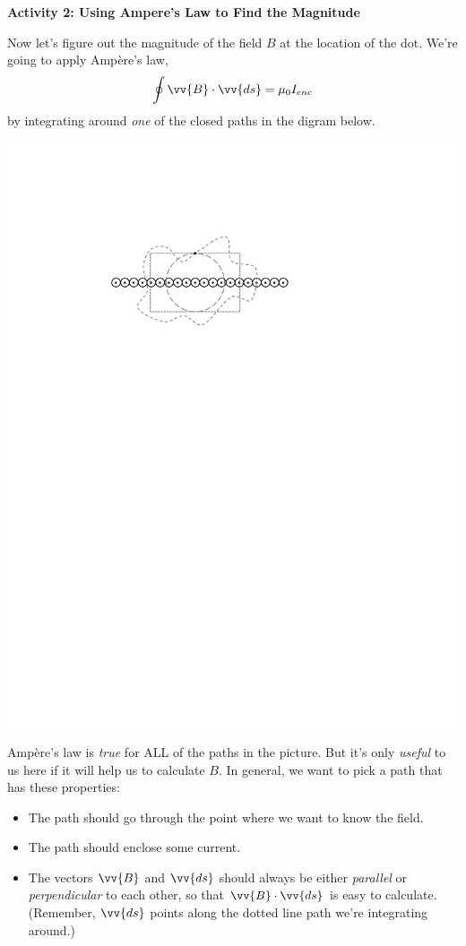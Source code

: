 \textbf{Activity 2: Using Ampere's Law to Find the Magnitude}

Now let's figure out the magnitude of the field $B$ at the location of the dot.
We're going to apply Amp\`ere's law,
\begin{equation*}
\oint \vv{B}\cdot \vv{ds} = \mu_0 I_{enc}
\end{equation*}
by integrating around \textit{one} of the closed paths in the digram below.

\begin{center}
\includegraphics{amperes_law_infinite_sheet/wires_with_dot_and_paths.pdf}
\end{center}

Amp\`ere's law is \textit{true} for ALL of the paths in the picture.  But it's only \textit{useful} to us here if it will help us to calculate $B$.  In general, we want to pick a path that has these properties:
\begin{itemize}[nosep]
\item The path should go through the point where we want to know the field.
\item The path should enclose some current.
\item The vectors $\vv{B}$ and $\vv{ds}$ should always be either \textit{parallel} or \textit{perpendicular} to each other, so that $\vv{B}\cdot \vv{ds}$ is easy to calculate.  (Remember, $\vv{ds}$ points along the dotted line path we're integrating around.)
\end{itemize}

